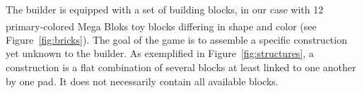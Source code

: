 The builder is equipped with a set of building blocks, in our case with 12 primary-colored Mega Bloks\textsuperscript{\textregistered} toy blocks differing in shape and color (see Figure~\ref{fig:bricks}). %
The goal of the game is to assemble a specific construction yet unknown to the builder. As exemplified in Figure~\ref{fig:structures}, a construction is a flat combination of several blocks at least linked to one another by one pad. It does not necessarily contain all available blocks.

\begin{figure}[!ht]
\centering
{}\qquad
{}\\
\end{figure}
